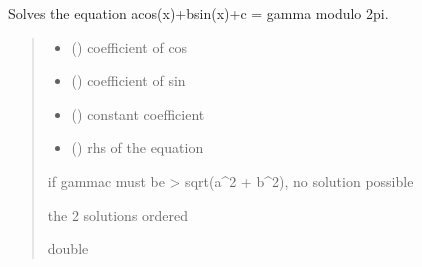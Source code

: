\documentclass[letterpaper,10pt,english]{sphinxmanual}
\begin{document}
\begin{fulllineitems}
\label{\detokenize{analytical_reject:analytical_reject.solve_trig_eq}}
\pysigstartsignatures
\pysiglinewithargsret
{}
{\sphinxparamcomma {}\sphinxparamcomma {}\sphinxparamcomma {}}
{}
\pysigstopsignatures
\sphinxAtStartPar
Solves the equation acos(x)+bsin(x)+c = gamma modulo 2pi.
\begin{quote}\begin{description}
\begin{itemize}
\item {} 
\sphinxAtStartPar
{} () \textendash{} coefficient of cos

\item {} 
\sphinxAtStartPar
{} () \textendash{} coefficient of sin

\item {} 
\sphinxAtStartPar
{} () \textendash{} constant coefficient

\item {} 
\sphinxAtStartPar
{} () \textendash{} rhs of the equation

\end{itemize}

\sphinxAtStartPar
{} \textendash{} if gamma\sphinxhyphen{}c must be \textgreater{} sqrt(a\textasciicircum{}2 + b\textasciicircum{}2), no solution possible

\sphinxAtStartPar
the 2 solutions ordered

\sphinxAtStartPar
double

\end{description}\end{quote}

\end{fulllineitems}


\sphinxstepscope
\end{document}
